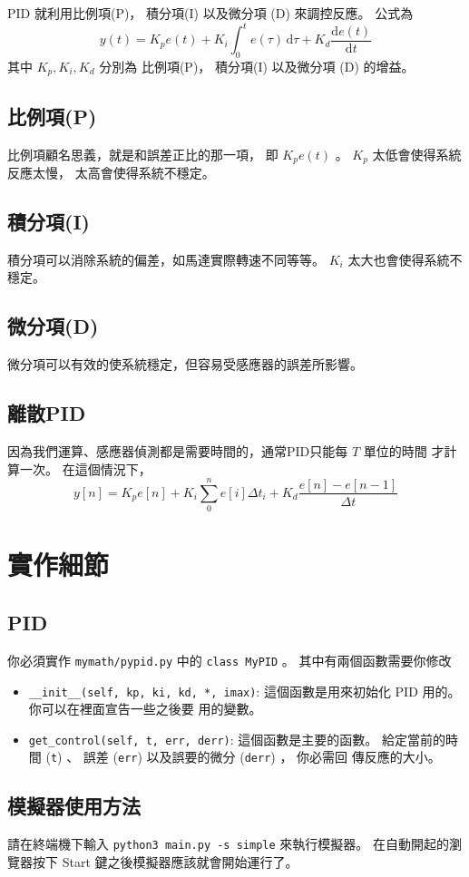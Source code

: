 \documentclass[12pt, a4paper]{article}
\newcommand{\dD}{\mathrm{d}}
\newcommand{\dI}{\,\mathrm{d}}
\begin{document}
PID 就利用比例項(P)， 積分項(I) 以及微分項 (D) 來調控反應。
公式為
\[ y(t) = K_p e(t) + K_i \int_{0}^{t} e(\tau) \dI \tau + K_d \frac{\dD e(t)}{\dD t}\]
其中 $K_p, K_i, K_d$ 分別為 比例項(P)， 積分項(I) 以及微分項 (D) 的增益。
\subsection{比例項(P)}
比例項顧名思義，就是和誤差正比的那一項， 即 $K_p e(t)$ 。
$K_p$ 太低會使得系統反應太慢， 太高會使得系統不穩定。
\subsection{積分項(I)}
積分項可以消除系統的偏差，如馬達實際轉速不同等等。
$K_i$ 太大也會使得系統不穩定。
\subsection{微分項(D)}
微分項可以有效的使系統穩定，但容易受感應器的誤差所影響。

\subsection{離散PID}
因為我們運算、感應器偵測都是需要時間的，通常PID只能每 $T$ 單位的時間
才計算一次。 在這個情況下，
\[ y[n] = K_p e[n] + K_i \sum_0^{n} e[i] \Delta t_i+ K_d \frac{e[n] - e[n-1]}{\Delta t} \]

\section{實作細節}
\subsection{PID}
你必須實作 \texttt{mymath/pypid.py} 中的 \texttt{class MyPID} 。 
其中有兩個函數需要你修改 
\begin{itemize}
  \item \texttt{__init__(self, kp, ki, kd, *, imax)}:
    這個函數是用來初始化 PID 用的。 你可以在裡面宣告一些之後要
    用的變數。

  \item \texttt{get_control(self, t, err, derr)}:
    這個函數是主要的函數。 給定當前的時間 (\texttt{t}) 、 誤差
    (\texttt{err}) 以及誤要的微分 (\texttt{derr}) ， 你必需回
    傳反應的大小。
\end{itemize}

\subsection{模擬器使用方法}
請在終端機下輸入 \texttt{python3 main.py -s simple} 來執行模擬器。
在自動開起的瀏覽器按下 Start 鍵之後模擬器應該就會開始運行了。
\end{document}
